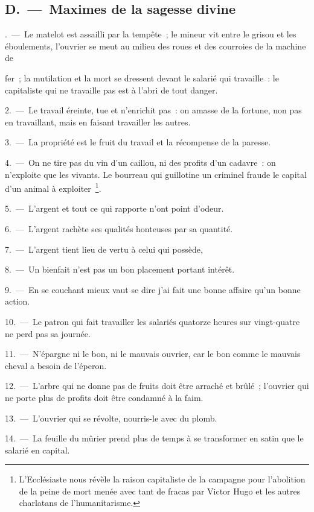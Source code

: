 \documentclass[french,twoside]{book} %
\begin{document}
\subsection[{D. — Maximes de la sagesse divine}]{D. — Maximes de la sagesse divine}
. — Le matelot est assailli par la tempête ; le mineur vit entre le grisou et les éboulements, l’ouvrier se meut au milieu des roues et des courroies de la machine de\par
fer ; la mutilation et la mort se dressent devant le salarié qui travaille : le capitaliste qui ne travaille pas est à l’abri de tout danger.\par
2. — Le travail éreinte, tue et n’enrichit pas : on amasse de la fortune, non pas en travaillant, mais en faisant travailler les autres.\par
3. — La propriété est le fruit du travail et la récompense de la paresse.\par
4. — On ne tire pas du vin d’un caillou, ni des profits d’un cadavre : on n’exploite que les vivants. Le bourreau qui guillotine un criminel fraude le capital d’un animal à exploiter \footnote{L'Ecclésiaste nous révèle la raison capitaliste de la campagne pour l’abolition de la peine de mort menée avec tant de fracas par Victor Hugo et les autres charlatans de l’humanitarisme.}.\par
5. — L'argent et tout ce qui rapporte n’ont point d’odeur.\par
6. — L'argent rachète ses qualités honteuses par sa quantité.\par
7. — L'argent tient lieu de vertu à celui qui possède,\par
8. — Un bienfait n’est pas un bon placement portant intérêt.\par
9. — En se couchant mieux vaut se dire j’ai fait une bonne affaire qu’un bonne action.\par
10. — Le patron qui fait travailler les salariés quatorze heures sur vingt-quatre ne perd pas sa journée.\par
11. — N'épargne ni le bon, ni le mauvais ouvrier, car le bon comme le mauvais cheval a besoin de l’éperon.\par
12. — L'arbre qui ne donne pas de fruits doit être arraché et brûlé ; l’ouvrier qui ne porte plus de profits doit être condamné à la faim.\par
13. — L'ouvrier qui se révolte, nourris-le avec du plomb.\par
14. — La feuille du mûrier prend plus de temps à se transformer en satin que le salarié en capital.\par
\end{document}
